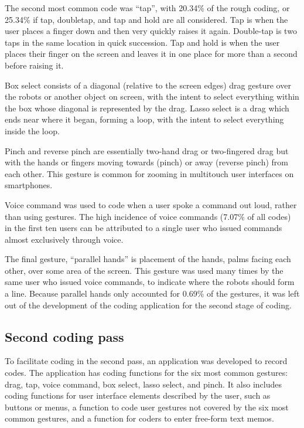 \documentclass[]{article}
\begin{document}
The second most common code was ``tap'', with 20.34\% of the rough coding, or 25.34\% if tap, doubletap, and tap and hold are all considered. Tap is when the user places a finger down and then very quickly raises it again. Double-tap is two taps in the same location in quick succession. Tap and hold is when the user places their finger on the screen and leaves it in one place for more than a second before raising it. 

Box select consists of a diagonal (relative to the screen edges) drag gesture over the robots or another object on screen, with the intent to select everything within the box whose diagonal is represented by the drag. 
Lasso select is a drag which ends near where it began, forming a loop, with the intent to select everything inside the loop. 

Pinch and reverse pinch are essentially two-hand drag or two-fingered drag but with the hands or fingers moving towards (pinch) or away (reverse pinch) from each other.
This gesture is common for zooming in multitouch user interfaces on smartphones. 

Voice command was used to code when a user spoke a command out loud, rather than using gestures. The high incidence of voice commands (7.07\% of all codes) in the first ten users can be attributed to a single user who issued commands almost exclusively through voice. 

The final gesture, ``parallel hands'' is placement of the hands, palms facing each other, over some area of the screen. This gesture was used many times by the same user who issued voice commands, to indicate where the robots should form a line. Because parallel hands only accounted for 0.69\% of the gestures, it was left out of the development of the coding application for the second stage of coding. 


 
\subsection{Second coding pass}

To facilitate coding in the second pass, an application was developed to record codes. 
The application has coding functions for the six most common gestures: drag, tap, voice command, box select, lasso select, and pinch. 
It also includes coding functions for user interface elements described by the user, such as buttons or menus, a function to code user gestures not covered by the six most common gestures, and a function for coders to enter free-form text memos. 
\end{document}
